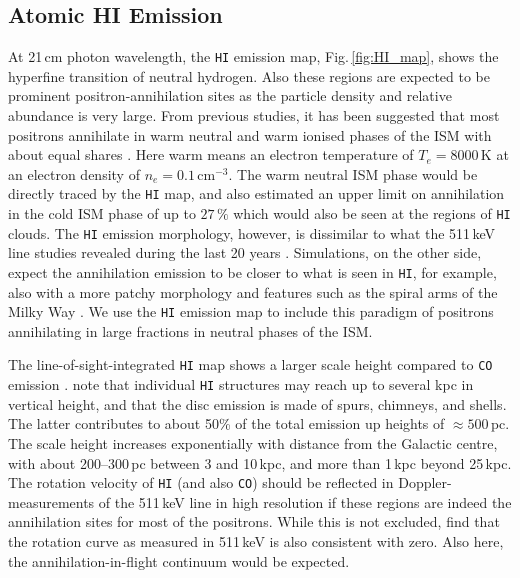 \documentclass[doublespace,nopageskip]{VTthesis} %
\newcommand{\mrm}[1]{\mathrm{#1}}
\begin{document}
\begin{appendices}
	
	\subsection{Atomic HI Emission}
	
	At 21\,cm photon wavelength, the \texttt{HI} emission map, Fig.\,\ref{fig:HI_map}, shows the hyperfine transition of neutral hydrogen.
	Also these regions are expected to be prominent positron-annihilation sites as the particle density and relative abundance is very large.
	From previous studies, it has been suggested that most positrons annihilate in warm neutral and warm ionised phases of the ISM with about equal shares \citep{Jean2006_511}.
	Here warm means an electron temperature of $T_e = 8000\,\mrm{K}$ at an electron density of $n_e = 0.1\,\mrm{cm^{-3}}$.
	The warm neutral ISM phase would be directly traced by the \texttt{HI} map, and \citet{Jean2006_511} also estimated an upper limit on annihilation in the cold ISM phase of up to $27\,\%$ which would also be seen at the regions of \texttt{HI} clouds.
	The \texttt{HI} emission morphology, however, is dissimilar to what the 511\,keV line studies revealed during the last 20 years \citep{Purcell1997_511,Knoedlseder2005_511,Siegert2016_511,Siegert2019_lv511,Skinner2014_511,Churazov2011_511}.
	Simulations, on the other side, expect the annihilation emission to be closer to what is seen in \texttt{HI}, for example, also with a more patchy morphology and features such as the spiral arms of the Milky Way \citep{Alexis2014_511ISM,Panther2018_pos_transport}.
	We use the \texttt{HI} emission map to include this paradigm of positrons annihilating in large fractions in neutral phases of the ISM. 
	
	The line-of-sight-integrated \texttt{HI} map shows a larger scale height compared to \texttt{CO} emission \citep{Dickey1990_HI}.
	\citet{Kalberla2009_HI} note that individual \texttt{HI} structures may reach up to several kpc in vertical height, and that the disc emission is made of spurs, chimneys, and shells.
	The latter contributes to about 50\% of the total emission up heights of $\approx 500$\,pc.
	The scale height increases exponentially with distance from the Galactic centre, with about 200--300\,pc between 3 and 10\,kpc, and more than 1\,kpc beyond 25\,kpc.
	The rotation velocity of \texttt{HI} (and also \texttt{CO}) should be reflected in Doppler-measurements of the 511\,keV line in high resolution if these regions are indeed the annihilation sites for most of the positrons.
	While this is not excluded, \citet{Siegert2019_lv511} find that the rotation curve as measured in 511\,keV is also consistent with zero.
	Also here, the annihilation-in-flight continuum would be expected.
	

\end{appendices}
\end{document}
